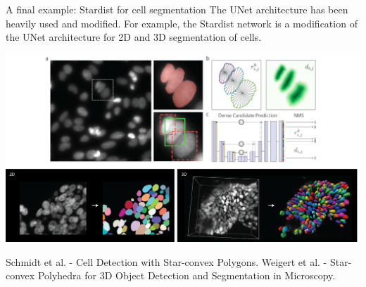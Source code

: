 \documentclass[9pt, aspectratio=169]{beamer}
\begin{document}
\begin{frame}
    {A final example: Stardist for cell segmentation}
    The UNet architecture has been heavily used and modified. For example, the Stardist network is a modification of the UNet architecture for 2D and 3D segmentation of cells.

    \centering
    \includegraphics[width=.7\textwidth]{stardist.png}

    Schmidt et al. - Cell Detection with Star-convex Polygons.
    Weigert et al. - Star-convex Polyhedra for 3D Object Detection and Segmentation in Microscopy.
\end{frame}
\end{document}
